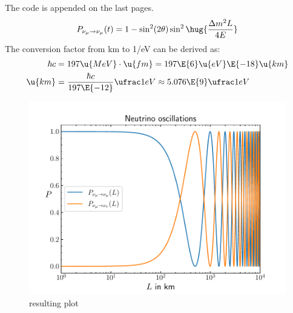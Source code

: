 \documentclass[exb]{exercise_5.0}
\begin{document}
\subsection{}
The code is appended on the last pages.
\begin{align*}
    P_{\nu_\mu\to \nu_\mu} (t) = 1 - \sin^2(2\theta)\sin^2\hug{\frac{\Delta m^2 L }{4 E}}
\end{align*}
The conversion factor from km to 1/eV can be derived as:
\begin{align*}
    \hbar c &= 197 \u{MeV} \cdot \u{fm} = 197\E{6} \u{eV} \E{-18}\u{km}\\
    \u {km} &= \frac{\hbar c}{197 \E{-12}} \ufrac1{eV} \approx 5.076\E{9} \ufrac1{eV}
\end{align*}
\begin{figure}[H]
    \centering
    \includegraphics[width=.8\textwidth]{neutrino_oscillations.pdf}
    \caption{resulting plot}
\end{figure}


\end{document}
